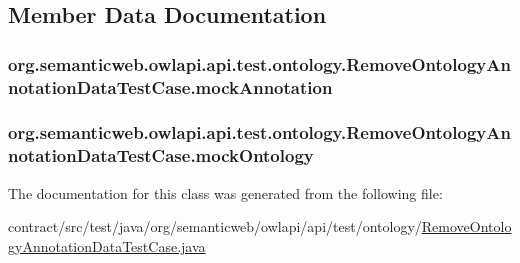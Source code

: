\subsection{Member Data Documentation}
\hypertarget{classorg_1_1semanticweb_1_1owlapi_1_1api_1_1test_1_1ontology_1_1_remove_ontology_annotation_data_test_case_aefe66ad01e3e6714683271ce853b4a45}{
\subsubsection[{mock\-Annotation}]{ org.\-semanticweb.\-owlapi.\-api.\-test.\-ontology.\-Remove\-Ontology\-Annotation\-Data\-Test\-Case.\-mock\-Annotation\hspace{0.3cm}{\ttfamily [private]}}}\label{classorg_1_1semanticweb_1_1owlapi_1_1api_1_1test_1_1ontology_1_1_remove_ontology_annotation_data_test_case_aefe66ad01e3e6714683271ce853b4a45}
\hypertarget{classorg_1_1semanticweb_1_1owlapi_1_1api_1_1test_1_1ontology_1_1_remove_ontology_annotation_data_test_case_afd37f162587761df89abac9d11b1afa1}{
\subsubsection[{mock\-Ontology}]{ org.\-semanticweb.\-owlapi.\-api.\-test.\-ontology.\-Remove\-Ontology\-Annotation\-Data\-Test\-Case.\-mock\-Ontology\hspace{0.3cm}{\ttfamily [private]}}}\label{classorg_1_1semanticweb_1_1owlapi_1_1api_1_1test_1_1ontology_1_1_remove_ontology_annotation_data_test_case_afd37f162587761df89abac9d11b1afa1}


The documentation for this class was generated from the following file\-:\begin{DoxyCompactItemize}
\item 
contract/src/test/java/org/semanticweb/owlapi/api/test/ontology/\hyperlink{_remove_ontology_annotation_data_test_case_8java}{Remove\-Ontology\-Annotation\-Data\-Test\-Case.\-java}\end{DoxyCompactItemize}

